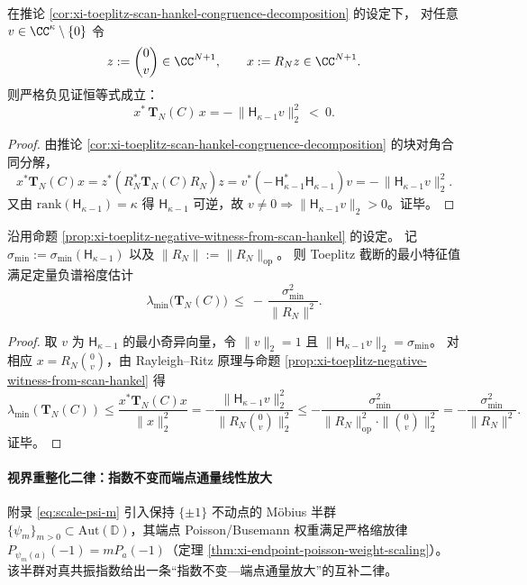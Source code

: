 \begin{proposition}\label{prop:xi-toeplitz-negative-witness-from-scan-hankel}
在推论 \ref{cor:xi-toeplitz-scan-hankel-congruence-decomposition} 的设定下，
对任意 \(v\in\CC^{\kappa}\setminus\{0\}\) 令
\[
z:=\binom{0}{v}\in\CC^{N+1},
\qquad
x:=R_N z\in\CC^{N+1}.
\]
则严格负见证恒等式成立：
\[
\boxed{\;
x^\ast\,\mathbf{T}_N(C)\,x
=-\,\|\mathsf H_{\kappa-1}v\|_2^2\ <\ 0. \;}
\]
\end{proposition}
\begin{proof}
由推论 \ref{cor:xi-toeplitz-scan-hankel-congruence-decomposition} 的块对角合同分解，
\[
x^\ast\mathbf{T}_N(C)x
=z^\ast\!\left(R_N^\ast\mathbf{T}_N(C)R_N\right)\!z
=v^\ast\!\left(-\,\mathsf H_{\kappa-1}^{\ast}\mathsf H_{\kappa-1}\right)\!v
=-\,\|\mathsf H_{\kappa-1}v\|_2^2.
\]
又由 \(\mathrm{rank}(\mathsf H_{\kappa-1})=\kappa\) 得 \(\mathsf H_{\kappa-1}\) 可逆，故 \(v\neq 0\Rightarrow \|\mathsf H_{\kappa-1}v\|_2>0\)。证毕。
\end{proof}

\begin{corollary}\label{cor:xi-toeplitz-negative-margin-from-hankel-fingerprint}
沿用命题 \ref{prop:xi-toeplitz-negative-witness-from-scan-hankel} 的设定。
记
\(
\sigma_{\min}:=\sigma_{\min}(\mathsf H_{\kappa-1})
\)
以及
\(
\|R_N\|:=\|R_N\|_{\mathrm{op}}
\)。
则 Toeplitz 截断的最小特征值满足定量负谱裕度估计
\[
\boxed{\;
\lambda_{\min}\!\bigl(\mathbf{T}_N(C)\bigr)\ \le\ -\,\frac{\sigma_{\min}^2}{\|R_N\|^2}. \;}
\]
\end{corollary}
\begin{proof}
取 \(v\) 为 \(\mathsf H_{\kappa-1}\) 的最小奇异向量，令 \(\|v\|_2=1\) 且 \(\|\mathsf H_{\kappa-1}v\|_2=\sigma_{\min}\)。
对相应 \(x=R_N\binom{0}{v}\)，由 Rayleigh--Ritz 原理与命题 \ref{prop:xi-toeplitz-negative-witness-from-scan-hankel} 得
\[
\lambda_{\min}(\mathbf{T}_N(C))
\le \frac{x^\ast\mathbf{T}_N(C)x}{\|x\|_2^2}
=-\frac{\|\mathsf H_{\kappa-1}v\|_2^2}{\|R_N\binom{0}{v}\|_2^2}
\le -\frac{\sigma_{\min}^2}{\|R_N\|_{\mathrm{op}}^2\cdot \|\binom{0}{v}\|_2^2}
=-\frac{\sigma_{\min}^2}{\|R_N\|^2}.
\]
证毕。
\end{proof}

\paragraph{视界重整化二律：指数不变而端点通量线性放大}
附录 \eqref{eq:scale-psi-m} 引入保持 \(\{\pm 1\}\) 不动点的 Möbius 半群 \(\{\psi_m\}_{m>0}\subset\mathrm{Aut}(\mathbb{D})\)，其端点 Poisson/Busemann 权重满足严格缩放律 \(P_{\psi_m(a)}(-1)=mP_a(-1)\)（定理 \ref{thm:xi-endpoint-poisson-weight-scaling}）。
该半群对真共振指数给出一条“指数不变—端点通量放大”的互补二律。

